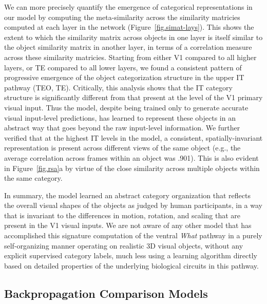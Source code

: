 \documentclass[11pt,twoside]{article}
\newif\myifpdf
\begin{document}
We can more precisely quantify the emergence of categorical representations in our model by computing the meta-similarity across the similarity matricies computed at each layer in the network (Figure~\ref{fig.simat-lays}).  This shows the extent to which the similarity matrix across objects in one layer is itself similar to the object similarity matrix in another layer, in terms of a correlation measure across these similarity matricies.  Starting from either V1 compared to all higher layers, or TE compared to all lower layers, we found a consistent pattern of progressive emergence of the object categorization structure in the upper IT pathway (TEO, TE).  Critically, this analysis shows that the IT category structure is significantly different from that present at the level of the V1 primary visual input.  Thus the model, despite being trained only to generate accurate visual input-level predictions, has learned to represent these objects in an abstract way that goes beyond the raw input-level information.  We further verified that at the highest IT levels in the model, a consistent, spatially-invariant representation is present across different views of the same object (e.g., the average correlation across frames within an object was .901).  This is also evident in Figure~\ref{fig.rsa}a by virtue of the close similarity across multiple objects within the same category.

In summary, the model learned an abstract category organization that reflects the overall visual shapes of the objects as judged by human participants, in a way that is invariant to the differences in motion, rotation, and scaling that are present in the V1 visual inputs.  We are not aware of any other model that has accomplished this signature computation of the ventral \emph{What} pathway in a purely self-organizing manner operating on realistic 3D visual objects, without any explicit supervised category labels, much less using a learning algorithm directly based on detailed properties of the underlying biological circuits in this pathway.

\subsection{Backpropagation Comparison Models}
\end{document}
